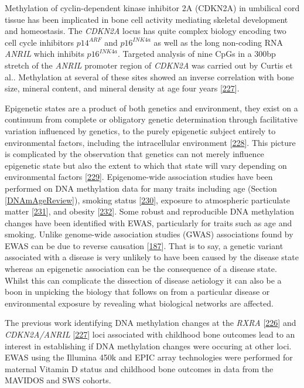 \documentclass[
]{book}
\begin{document}
Methylation of cyclin-dependent kinase inhibitor 2A (CDKN2A) in umbilical cord tissue has been implicated in bone cell activity mediating skeletal development and homeostasis.
The \emph{CDKN2A} locus has quite complex biology encoding two cell cycle inhibitors \(p14^{ARF}\) and \(p16^{INK4a}\) as well as the long non-coding RNA \emph{ANRIL} which inhibits \(p16^{INK4a}\).
Targeted analysis of nine CpGs in a 300bp stretch of the \emph{ANRIL} promoter region of \emph{CDKN2A} was carried out by Curtis et al..
Methylation at several of these sites showed an inverse correlation with bone size, mineral content, and mineral density at age four years {[}\protect\hyperlink{ref-Curtis2017}{227}{]}.

Epigenetic states are a product of both genetics and environment, they exist on a continuum from complete or obligatory genetic determination through facilitative variation influenced by genetics, to the purely epigenetic subject entirely to environmental factors, including the intracellular environment {[}\protect\hyperlink{ref-Richards2006}{228}{]}.
This picture is complicated by the observation that genetics can not merely influence epigenetic state but also the extent to which that state will vary depending on environmental factors {[}\protect\hyperlink{ref-Holland2017}{229}{]}.
Epigenome-wide association studies have been performed on DNA methylation data for many traits including age (Section \ref{DNAmAgeReview}), smoking status {[}\protect\hyperlink{ref-Dogan2017}{230}{]}, exposure to atmospheric particulate matter {[}\protect\hyperlink{ref-Dai2016}{231}{]}, and obesity {[}\protect\hyperlink{ref-Wahl2016}{232}{]}.
Some robust and reproducible DNA methylation changes have been identified with EWAS, particularly for traits such as age and smoking.
Unlike genome-wide association studies (GWAS) associations found by EWAS can be due to reverse causation {[}\protect\hyperlink{ref-Birney2016}{187}{]}.
That is to say, a genetic variant associated with a disease is very unlikely to have been caused by the disease state whereas an epigenetic association can be the consequence of a disease state.
Whilst this can complicate the dissection of disease aetiology it can also be a boon in unpicking the biology that follows on from a particular disease or environmental exposure by revealing what biological networks are affected.

The previous work identifying DNA methylation changes at the \emph{RXRA} {[}\protect\hyperlink{ref-Harvey2014d}{226}{]} and \emph{CDKN2A/ANRIL} {[}\protect\hyperlink{ref-Curtis2017}{227}{]} loci associated with childhood bone outcomes lead to an interest in establishing if DNA methylation changes were occuring at other loci.
EWAS using the Illumina 450k and EPIC array technologies were performed for maternal Vitamin D status and childhood bone outcomes in data from the MAVIDOS and SWS cohorts.
\end{document}
